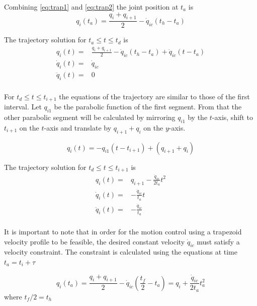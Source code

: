 Combining \ref{eq:trap1} and \ref{eq:trap2} the joint position at $t_a$ is
\begin{equation}
q_i(t_a) = \frac{q_i + q_{i+1}}{2} - \dot{q}_{ic}(t_h - t_a)
\end{equation}

The trajectory solution for $t_a \leq t \leq t_d$ is
\begin{equation}
\begin{aligned}
q_i(t) ={}& \frac{q_i + q_{i+1}}{2} - \dot{q}_{ic}(t_h - t_a) + \dot{q}_{ic}(t-t_a) \\
\dot{q}_i(t) ={}& \dot{q}_{ic} \\
\ddot{q}_i(t) ={}& 0 \\
\end{aligned}
\end{equation}

For $t_d \leq t \leq t_{i+1}$ the equations of the trajectory are similar to those of the first interval. Let $q_{i1}$ be the parabolic function of the first segment. From that the other 
parabolic segment will be calculated by mirroring $q_{i1}$ by the $t$-axis, shift to $t_{i+1}$ on the $t$-axis and translate by $q_{i+1} + q_i$ on the $y$-axis.

\begin{equation}
q_i(t) = -q_{i1}(t-t_{i+1}) + (q_{i+1} + q_i)
\end{equation}

The trajectory solution for $t_d \leq t \leq t_{i+1}$ is
\begin{equation}
\begin{aligned}
q_i(t) ={}& q_{i+1} - \frac{\dot{q}_{ic}}{2t_a}t^2 \\
\dot{q}_i(t) ={}& -\frac{\dot{q}_{ic}}{t_a}t \\
\ddot{q}_i(t) ={}& -\frac{\dot{q}_{ic}}{t_a} \\
\end{aligned}
\end{equation}

It is important to note that in order for the motion control using a trapezoid velocity profile to be feasible, the desired constant velocity $\dot{q}_{ic}$ must satisfy a velocity constraint. The constraint is 
calculated using the equations at time $t_a = t_i + τ$

\begin{equation}
q_i(t_a) = \frac{q_i + q_{i+1}}{2} - \dot{q}_{ic} \left( \frac{t_f}{2} - t_a \right) = q_i + \frac{\dot{q}_{ic}}{2t_a}t_a^2
\end{equation}
where $t_f/2 = t_h$

